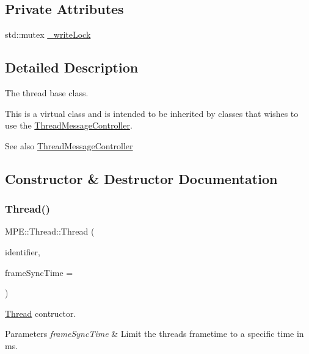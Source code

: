 \subsection*{Private Attributes}
\begin{DoxyCompactItemize}
\item 
std\+::mutex \hyperlink{class_m_p_e_1_1_thread_af03852c385981359d28bf776370aae3a}{\+\_\+write\+Lock}
\end{DoxyCompactItemize}


\subsection{Detailed Description}
The thread base class. 

This is a virtual class and is intended to be inherited by classes that wishes to use the \hyperlink{class_m_p_e_1_1_thread_message_controller}{Thread\+Message\+Controller}. \begin{DoxySeeAlso}{See also}
\hyperlink{class_m_p_e_1_1_thread_message_controller}{Thread\+Message\+Controller} 
\end{DoxySeeAlso}


\subsection{Constructor \& Destructor Documentation}
\mbox{\label{class_m_p_e_1_1_thread_a6b7b08a261115586ae914a9a2325c299}} 
\subsubsection{\texorpdfstring{Thread()}{Thread()}}
{\footnotesize\ttfamily M\+P\+E\+::\+Thread\+::\+Thread (\begin{DoxyParamCaption}\item[{\hyperlink{namespace_m_p_e_a16447295e3105bd2ba2a9ea303566175}{thread\+Identifier}}]{identifier,  }\item[{uint8\+\_\+t}]{frame\+Sync\+Time = {} }\end{DoxyParamCaption})\hspace{0.3cm}{\ttfamily [protected]}}



\hyperlink{class_m_p_e_1_1_thread}{Thread} contructor. 


\begin{DoxyParams}{Parameters}
{\em frame\+Sync\+Time} & Limit the thread\textquotesingle{}s frametime to a specific time in ms. \\
\hline
\end{DoxyParams}
\mbox{\label{class_m_p_e_1_1_thread_a5addf4f2209106f58447e2c46087c8d7}} 
